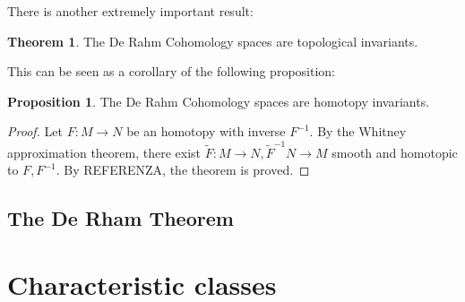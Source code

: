 \documentclass[12pt,a4paper]{report}
\theoremstyle{definition}
\theoremstyle{Theorem}
\newtheorem{Theo}[Def]{Theorem}
\newtheorem{Prop}[Def]{Proposition}
\theoremstyle{definition}
\theoremstyle{definition}
\begin{document}
	There is another extremely important result:
	\begin{Theo}
		The De Rahm Cohomology spaces are topological invariants.
	\end{Theo}
	This can be seen as a corollary of the following proposition:
	\begin{Prop}
		The De Rahm Cohomology spaces are homotopy invariants.
	\end{Prop}
	\begin{proof}
		Let $F:M\rightarrow N$ be an homotopy with inverse $F^{-1}$. By the Whitney approximation theorem, there exist $\tilde{F}:M\rightarrow N,\tilde{F}^{-1}N\rightarrow M$ smooth and homotopic to $F,F^{-1}$. By REFERENZA, the theorem is proved.
	\end{proof}
	\section{The De Rham Theorem}	
	\chapter{Characteristic classes}
\end{document}
